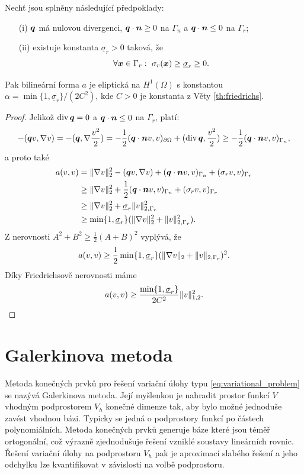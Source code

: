 \begin{veta}
Nechť jsou splněny následující předpoklady:
\begin{itemize}
\item[(i)] $\mathbf{\boldsymbol{q}}$ má nulovou divergenci, $\mathbf{\boldsymbol{q}}\cdot\mathbf{\boldsymbol{n}}\ge 0$ na $\Gamma_n$ a $\mathbf{\boldsymbol{q}}\cdot\mathbf{\boldsymbol{n}}\le 0$ na $\Gamma_r$;
\item[(ii)] existuje konstanta $\underline\sigma_r>0$ taková, že
\[ \forall\mathbf{\boldsymbol{x}}\in\Gamma_r:~\sigma_r(\mathbf{\boldsymbol{x}})\ge\underline\sigma_r\ge 0. \]
\end{itemize}
Pak bilineární forma $a$ je eliptická na $H^1(\Omega)$ s konstantou $\alpha=\min\{1,\underline\sigma_r\}/(2C^2)$, kde $C>0$ je konstanta z Věty \ref{th:friedrichs}.
\end{veta}
\begin{proof}
Jelikož $\operatorname{div}\mathbf{\boldsymbol{q}}=0$ a $\mathbf{\boldsymbol{q}}\cdot\mathbf{\boldsymbol{n}}\le 0$ na $\Gamma_r$, platí:
\[ -(\mathbf{\boldsymbol{q}} v,\nabla v) = -(\mathbf{\boldsymbol{q}},\nabla\frac{v^2}2) = -\frac12(\mathbf{\boldsymbol{q}}\cdot\mathbf{\boldsymbol{n}} v,v)_{\partial\Omega} +(\operatorname{div}\mathbf{\boldsymbol{q}},\frac{v^2}2) \ge -\frac12(\mathbf{\boldsymbol{q}}\cdot\mathbf{\boldsymbol{n}} v,v)_{\Gamma_n}, \]
a proto také
\begin{align*}
a(v,v) & = \|\nabla v\|_2^2 - (\mathbf{\boldsymbol{q}} v,\nabla v) + (\mathbf{\boldsymbol{q}}\cdot\mathbf{\boldsymbol{n}} v,v)_{\Gamma_n} + (\sigma_r v,v)_{\Gamma_r}\\
&\ge \|\nabla v\|_2^2 + \frac12 (\mathbf{\boldsymbol{q}}\cdot\mathbf{\boldsymbol{n}} v,v)_{\Gamma_n} + (\sigma_r v,v)_{\Gamma_r}\\
&\ge \|\nabla v\|_2^2 + \underline\sigma_r\|v\|_{2,\Gamma_r}^2\\
&\ge \min\{1,\underline\sigma_r\}(\|\nabla v\|_2^2 + \|v\|_{2,\Gamma_r}^2).
\end{align*}
Z nerovnosti $A^2+B^2\ge \frac12(A+B)^2$ vyplývá, že
\[ a(v,v) \ge \frac12\min\{1,\underline\sigma_r\}(\|\nabla v\|_2 + \|v\|_{2,\Gamma_r})^2. \]
Díky Friedrichsově nerovnosti máme
\[ a(v,v) \ge \frac{\min\{1,\underline\sigma_r\}}{2C^2}\| v\|_{1,2}^2. \]
\end{proof}








\section{Galerkinova metoda}

Metoda konečných prvků pro řešení variační úlohy typu \eqref{eq:variational_problem} se nazývá Galerkinova metoda.
Její myšlenkou je nahradit prostor funkcí $V$ vhodným podprostorem $V_h$ konečné dimenze tak, aby bylo možné jednoduše zavést vhodnou bázi.
Typicky se jedná o podprostory funkcí po částech polynomiálních.
Metoda konečných prvků generuje báze které jsou téměř ortogonální, což výrazně zjednodušuje řešení vzniklé soustavy lineárních rovnic.
Řešení variační úlohy na podprostoru $V_h$ pak je aproximací slabého řešení a jeho odchylku lze kvantifikovat v závislosti na volbě podprostoru.


